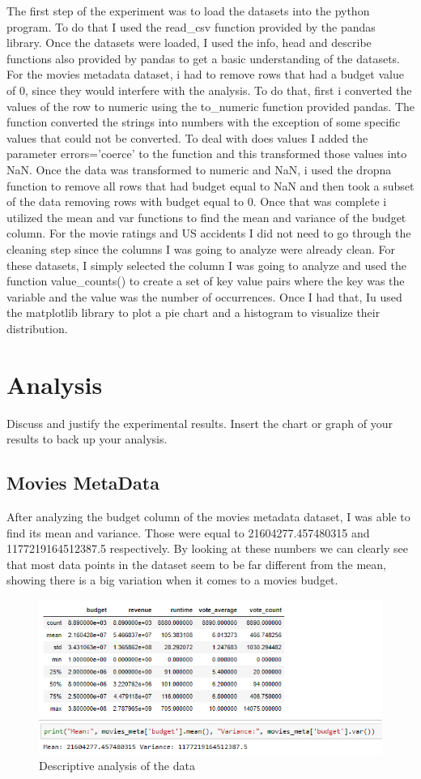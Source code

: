\documentclass{article}
\begin{document}
The first step of the experiment was to load the datasets into the python program. To do that I used the read\_csv function provided by the pandas library. Once the datasets were loaded, I used the info, head and describe functions also provided by pandas to get a basic understanding of the datasets. For the movies metadata dataset, i had to remove rows that had a budget value of 0, since they would interfere with the analysis. To do that, first i converted the values of the row to numeric using the to\_numeric function provided pandas. The function converted the strings into numbers with the exception of some specific values that could not be converted. To deal with does values I added the parameter errors='coerce' to the function and this transformed those values into NaN. Once the data was transformed to numeric and NaN, i used the dropna function to remove all rows that had budget equal to NaN and then took a subset of the data removing rows with budget equal to 0. Once that was complete i utilized the mean and var functions to find the mean and variance of the budget column. For the movie ratings and US accidents I did not need to go through the cleaning step since the columns I was going to analyze were already clean. For these datasets, I simply selected the column I was going to analyze and used the function value\_counts() to create a set of key value pairs where the key was the variable and the value was the number of occurrences. Once I had that, Iu used the matplotlib library to plot a pie chart and a histogram to visualize their distribution.


\section{Analysis}

Discuss and justify the experimental results. Insert the chart or graph of your results to back up your analysis.
\subsection{Movies MetaData}
After analyzing the budget column of the movies metadata dataset, I was able to find its mean and variance. Those were equal to 21604277.457480315 and 1177219164512387.5 respectively. By looking at these numbers we can clearly see that most data points in the dataset seem to be far different from the mean, showing there is a big variation when it comes to a movies budget.

\begin{figure}[H]
	\centering
	\includegraphics{moivie_meta}
	\caption{Descriptive analysis of the data}
\end{figure}
\end{document}
